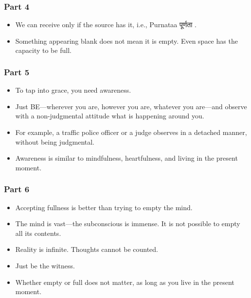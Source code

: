 \begin{frame}[fragile]\frametitle{Part 4}

\begin{itemize}
    \item We can receive only if the source has it, i.e., Purnataa पूर्णता .
    \item Something appearing blank does not mean it is empty. Even space has the capacity to be full.
\end{itemize}

\end{frame}

\begin{frame}[fragile]\frametitle{Part 5}

\begin{itemize}
    \item To tap into grace, you need awareness.
    \item Just BE—wherever you are, however you are, whatever you are—and observe with a non-judgmental attitude what is happening around you.
    \item For example, a traffic police officer or a judge observes in a detached manner, without being judgmental.
    \item Awareness is similar to mindfulness, heartfulness, and living in the present moment.
\end{itemize}

\end{frame}

\begin{frame}[fragile]\frametitle{Part 6}

\begin{itemize}
    \item Accepting fullness is better than trying to empty the mind.
    \item The mind is vast—the subconscious is immense. It is not possible to empty all its contents.
    \item Reality is infinite. Thoughts cannot be counted.
    \item Just be the witness.
    \item Whether empty or full does not matter, as long as you live in the present moment.
\end{itemize}

\end{frame}

